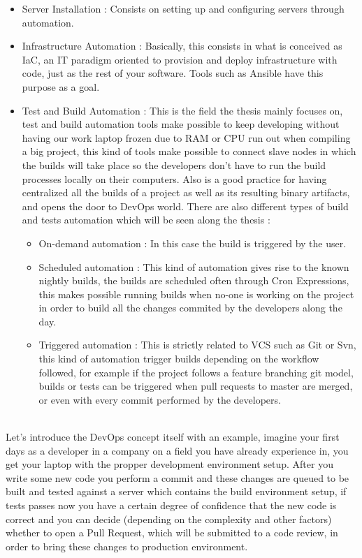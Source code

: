 \documentclass{article}
\begin{document}
\begin{itemize}
    \item Server Installation : Consists on setting up and configuring servers through automation.
    \item Infrastructure Automation : Basically, this consists in what is conceived as \gls{IaC}, an IT paradigm oriented to provision and deploy infrastructure with code, just as the rest of your software. Tools such as Ansible have this purpose as a goal.
    \item Test and Build Automation : This is the field the thesis mainly focuses on, test and build automation tools make possible to keep developing without having our work laptop frozen due to RAM or CPU run out when compiling a big project, this kind of tools make possible to connect slave nodes in which the builds will take place so the developers don't have to run the build processes locally on their computers. Also is a good practice for having centralized all the builds of a project as well as its resulting binary artifacts, and opens the door to DevOps world. There are also different types of build and tests automation which will be seen along the thesis : 
    \begin{itemize}
        \item On-demand automation : In this case the build is triggered by the user.
        \item Scheduled automation : This kind of automation gives rise to the known nightly builds, the builds are scheduled often through Cron Expressions, this makes possible running builds when no-one is working on the project in order to build all the changes commited by the developers along the day.
        \item Triggered automation : This is strictly related to \gls{VCS} such as Git or Svn, this kind of automation trigger builds depending on the workflow followed, for example if the project follows a feature branching git model, builds or tests can be triggered when pull requests to master are merged, or even with every commit performed by the developers.
    \end{itemize}
\end{itemize}
\newpage
~\\
Let's introduce the DevOps concept itself with an example, imagine your first days as a developer in a company on a field you have already experience in, you get your laptop with the propper development environment setup. After you write some new code you perform a commit and these changes are queued to be built and tested against a server which contains the build environment setup, if tests passes now you have a certain degree of confidence that the new code is correct and you can decide (depending on the complexity and other factors) whether to open a Pull Request, which will be submitted to a code review, in order to bring these changes to production environment. 
\end{document}
